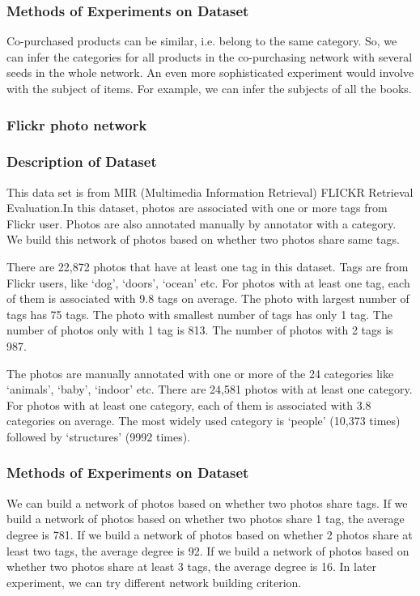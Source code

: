\subsubsection*{Methods of Experiments on Dataset}

Co-purchased products can be similar, i.e. belong to the same category.
So, we can infer the categories for all products in the co-purchasing network with several seeds in the whole network.
An even more sophisticated experiment would involve with the subject of items. For example, we can infer the subjects of all the books.

\subsubsection{Flickr photo network}

\subsubsection*{Description of Dataset}
This data set is from MIR (Multimedia Information Retrieval) FLICKR Retrieval Evaluation.In this dataset, photos are associated with one or more tags from Flickr user. Photos are also annotated manually by annotator with a category. We build this network of photos based on whether two photos share same tags. 

There are 22,872 photos that have at least one tag in this dataset. Tags are from Flickr users, like ‘dog’, ‘doors’, ‘ocean’ etc. For photos with at least one tag, each of them is associated with 9.8 tags on average. The photo with largest number of tags has 75 tags. The photo with smallest number of tags has only 1 tag. The number of photos only with 1 tag is 813. The number of photos with 2 tags is 987.

The photos are manually annotated with one or more of the 24 categories like ‘animals’, ‘baby’, ‘indoor’ etc. There are 24,581 photos with at least one category. For photos with at least one category, each of them is associated with 3.8 categories on average.  The most widely used category is ‘people’ (10,373 times) followed by ‘structures’ (9992 times). 

\subsubsection*{Methods of Experiments on Dataset}
We can build a network of photos based on whether two photos share tags. If we build a network of photos based on whether two photos share 1 tag, the average degree is 781. If we build a network of photos based on whether 2 photos share at least two tags, the average degree is 92. If we build a network of photos based on whether two photos share at least 3 tags, the average degree is 16. In later experiment, we can try different network building criterion.

